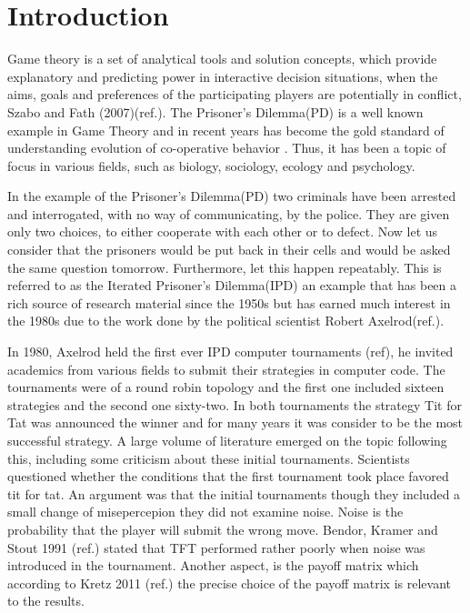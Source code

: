 \chapter{Introduction}

Game theory is a set of analytical tools and solution concepts, which provide
explanatory and predicting power in interactive decision situations, when the
aims, goals and preferences of the participating players are potentially in
conflict, Szabo and Fath (2007)(ref.). The Prisoner's Dilemma(PD) is a well
known example in Game Theory and in recent years has become the gold standard of
understanding evolution of co-operative behavior \parencite{Lorberbaum1994}.
Thus, it has been a topic of focus in various fields, such as biology,
sociology, ecology and psychology. %

In the example of the Prisoner's Dilemma(PD) two criminals have been arrested
and interrogated, with no way of communicating, by the police. They are given
only two choices, to either cooperate with each other or to defect.  Now let us
consider that the prisoners would be put back in their cells and would be asked
the same question tomorrow. Furthermore, let this happen repeatably. This is
referred to as the Iterated Prisoner's Dilemma(IPD) an example that has been a
rich source of research material since the 1950s but has earned much interest in
the 1980s due to the work done by the political scientist Robert Axelrod(ref.).

In 1980, Axelrod held the first ever IPD computer tournaments (ref), he invited
academics from various fields to submit their strategies in computer code. The
tournaments were of a round robin topology and the first one included sixteen
strategies and the second one sixty-two. %
In both tournaments the strategy Tit
for Tat was announced the winner and for many years it  was consider to be the
most successful strategy.
A large volume of literature emerged on the topic
following this, including some criticism about these initial tournaments.
Scientists questioned
whether the conditions that the first tournament took place favored
tit for tat.
An argument was that the initial tournaments though they included
a small change of misepercepion
they did not examine noise. Noise is the probability
that the player will submit the wrong move. Bendor, Kramer and Stout 1991 (ref.)
stated that TFT performed rather poorly when noise was introduced in the tournament.
Another aspect, is the payoff matrix which according to Kretz 2011 (ref.)
the precise choice of the payoff matrix is relevant to the results.

